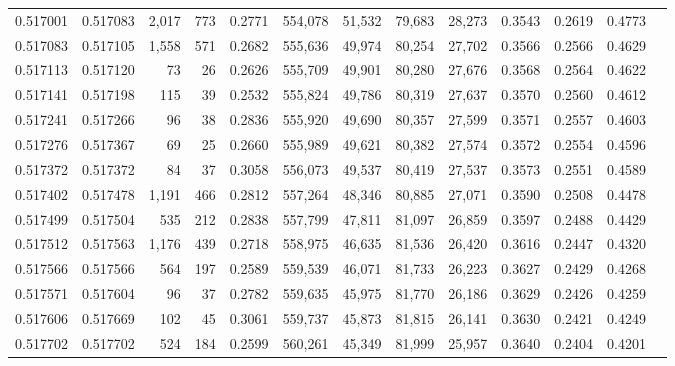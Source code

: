 \begin{tabular}{rrrrrrrrrrrrr}
0.517001 & 0.517083 & 2,017 &   773 &                                     0.2771 & 554,078 &  51,532 &  79,683 &  28,273 & 0.3543 & 0.2619 & 0.4773 \\
0.517083 & 0.517105 & 1,558 &   571 &                                     0.2682 & 555,636 &  49,974 &  80,254 &  27,702 & 0.3566 & 0.2566 & 0.4629 \\
0.517113 & 0.517120 &    73 &    26 &                                     0.2626 & 555,709 &  49,901 &  80,280 &  27,676 & 0.3568 & 0.2564 & 0.4622 \\
0.517141 & 0.517198 &   115 &    39 &                                     0.2532 & 555,824 &  49,786 &  80,319 &  27,637 & 0.3570 & 0.2560 & 0.4612 \\
0.517241 & 0.517266 &    96 &    38 &                                     0.2836 & 555,920 &  49,690 &  80,357 &  27,599 & 0.3571 & 0.2557 & 0.4603 \\
0.517276 & 0.517367 &    69 &    25 &                                     0.2660 & 555,989 &  49,621 &  80,382 &  27,574 & 0.3572 & 0.2554 & 0.4596 \\
0.517372 & 0.517372 &    84 &    37 &                                     0.3058 & 556,073 &  49,537 &  80,419 &  27,537 & 0.3573 & 0.2551 & 0.4589 \\
0.517402 & 0.517478 & 1,191 &   466 &                                     0.2812 & 557,264 &  48,346 &  80,885 &  27,071 & 0.3590 & 0.2508 & 0.4478 \\
0.517499 & 0.517504 &   535 &   212 &                                     0.2838 & 557,799 &  47,811 &  81,097 &  26,859 & 0.3597 & 0.2488 & 0.4429 \\
0.517512 & 0.517563 & 1,176 &   439 &                                     0.2718 & 558,975 &  46,635 &  81,536 &  26,420 & 0.3616 & 0.2447 & 0.4320 \\
0.517566 & 0.517566 &   564 &   197 &                                     0.2589 & 559,539 &  46,071 &  81,733 &  26,223 & 0.3627 & 0.2429 & 0.4268 \\
0.517571 & 0.517604 &    96 &    37 &                                     0.2782 & 559,635 &  45,975 &  81,770 &  26,186 & 0.3629 & 0.2426 & 0.4259 \\
0.517606 & 0.517669 &   102 &    45 &                                     0.3061 & 559,737 &  45,873 &  81,815 &  26,141 & 0.3630 & 0.2421 & 0.4249 \\
0.517702 & 0.517702 &   524 &   184 &                                     0.2599 & 560,261 &  45,349 &  81,999 &  25,957 & 0.3640 & 0.2404 & 0.4201 \\

\end{tabular}
